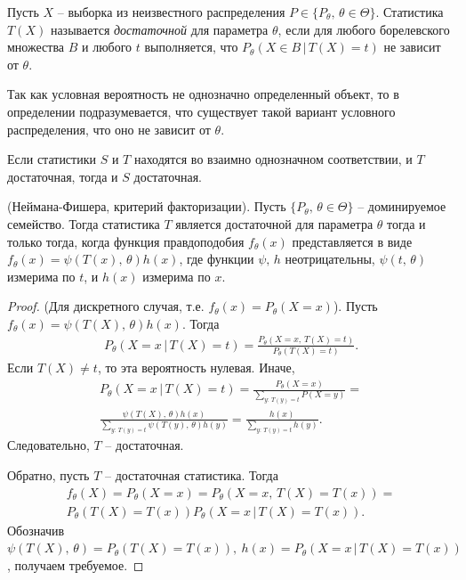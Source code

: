 \begin{definition}
    Пусть $X$ -- выборка из неизвестного распределения $P \in \{P_\theta,\, \theta \in \Theta\}$. Статистика $T(X)$ называется \textit{достаточной} для параметра $\theta$, если для любого борелевского множества $B$ и любого $t$ выполняется, что $P_\theta(X \in B\, \vert\, T(X) = t)$ не зависит от $\theta$.
\end{definition}
\begin{note}
    Так как условная вероятность не однозначно определенный объект, то в определении подразумевается, что существует такой вариант условного распределения, что оно не зависит от $\theta$.
\end{note}
\begin{note}
    Если статистики $S$ и $T$ находятся во взаимно однозначном соответствии, и $T$ достаточная, тогда и $S$ достаточная.
\end{note}
\begin{theorem} 
    (Неймана-Фишера, критерий факторизации). Пусть $\{P_\theta,\, \theta \in \Theta\}$ -- доминируемое семейство. Тогда статистика $T$ является достаточной для параметра $\theta$ тогда и только тогда, когда функция правдоподобия $f_\theta(x)$ представляется в виде $f_\theta(x) = \psi(T(x),\, \theta)h(x)$, где функции $\psi,\, h$ неотрицательны, $\psi(t,\, \theta)$ измерима по $t$, и $h(x)$ измерима по $x$.
\end{theorem}
\begin{proof}
    (Для дискретного случая, т.е. $f_\theta(x) = P_\theta(X = x)$). Пусть $f_\theta(x) = \psi(T(X),\, \theta)h(x)$. Тогда 
    \begin{gather*}
        P_\theta(X = x\, \vert\, T(X) = t) = \frac{P_\theta(X = x,\, T(X) = t)}{P_\theta(T(X) = t)}.
    \end{gather*}
    Если $T(X) \ne t$, то эта вероятность нулевая. Иначе,
    \begin{gather*}
        P_\theta(X = x\, \vert\, T(X) = t) = \frac{P_\theta (X = x)}{\sum_{y:\, T(y) = t}P(X = y)} =\\ \frac{\psi(T(X),\, \theta)h(x)}{\sum_{y:\, T(y) = t}\psi(T(y),\, \theta)h(y)} = \frac{h(x)}{\sum_{y:\, T(y) = t}h(y)}.
    \end{gather*}
    Следовательно, $T$ -- достаточная.
    
    Обратно, пусть $T$ -- достаточная статистика. Тогда
    \begin{gather*}
        f_\theta(X)=P_\theta(X = x) = P_\theta(X = x,\, T(X) = T(x)) =\\ P_\theta(T(X) = T(x))P_\theta(X = x\, \vert\, T(X) = T(x)).
    \end{gather*}
    Обозначив $\psi(T(X),\, \theta) = P_\theta(T(X) = T(x)),\ h(x) = P_\theta(X = x\, \vert\, T(X) = T(x))$, получаем требуемое.
\end{proof}


